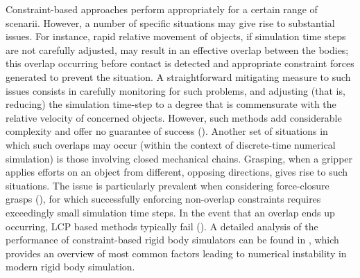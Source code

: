 Constraint-based approaches perform appropriately for a certain range of scenarii. However, a number of specific situations may give rise to substantial issues. For instance, rapid relative movement of objects, if simulation time steps are not carefully adjusted, may result in an effective overlap between the bodies; this overlap occurring before contact is detected and appropriate constraint forces generated to prevent the situation. A straightforward mitigating measure to such issues consists in carefully monitoring for such problems, and adjusting (that is, reducing) the simulation time-step to a degree that is commensurate with the relative velocity of concerned objects. However, such methods add considerable complexity and offer no guarantee of success (\cite{engine_simulation}). Another set of situations in which such overlaps may occur (within the context of discrete-time numerical simulation) is those involving closed mechanical chains. Grasping, when a gripper applies efforts on an object from different, opposing directions, gives rise to such situations. The issue is particularly prevalent when considering force-closure grasps (\cite{nguyen1988constructing}), for which successfully enforcing non-overlap constraints requires exceedingly small simulation time steps. In the event that an overlap ends up occurring, LCP based methods typically fail (\cite{baraff_analytical}). A detailed analysis of the performance of constraint-based rigid body simulators can be found in \cite{taylor2016analysis}, which provides an overview of most common factors leading to numerical instability in modern rigid body simulation.
\\[5pt]
